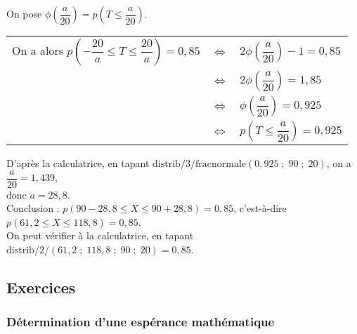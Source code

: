 \begin{itemize}
\vspace*{.3cm}

On pose $\phi\left(\dfrac{a}{20}\right) = p\left(T \leqslant \dfrac{a}{20}\right)$. \\

\vspace*{.1cm}

\begin{tabular}{lll}
\hspace{-.3cm} On a alors $p\left(-\dfrac{20}{a} \leqslant T \leqslant \dfrac{20}{a}\right) = 0,85$ & $\Longleftrightarrow$ & $2\phi\left(\dfrac{a}{20}\right) - 1 = 0,85$ \vspace*{.3cm} \\
& $\Longleftrightarrow$ & $2\phi\left(\dfrac{a}{20}\right) = 1,85$ \vspace*{.3cm} \\
& $\Longleftrightarrow$ & $\phi\left(\dfrac{a}{20}\right) = 0,925$ \vspace*{.3cm} \\
& $\Longleftrightarrow$ & $p\left(T \leqslant \dfrac{a}{20}\right) = 0,925$ \\
\end{tabular}

\vspace*{.3cm}

D'après la calculatrice, en tapant $\mathrm{distrib}/3/\mathrm{fracnormale}\left(0,925 \; ; \; 90 \; ; \; 20\right)$, on a $\dfrac{a}{20} = 1,439$, \\ donc $a = 28,8$. \\

Conclusion : $p\left(90 - 28,8 \leqslant X \leqslant 90 + 28,8\right) = 0,85$, c'est-à-dire $p\left(61,2 \leqslant X \leqslant 118,8\right) = 0,85$. \\

On peut vérifier à la calculatrice, en tapant $\mathrm{distrib}/2/\left(61,2 \; ; \; 118,8 \; ; \; 90 \; ; \; 20\right) = 0,85$. 

\end{itemize}

\vspace*{-5cm}

\newpage

\subsection{Exercices}

\subsubsection{Détermination d'une espérance mathématique}


